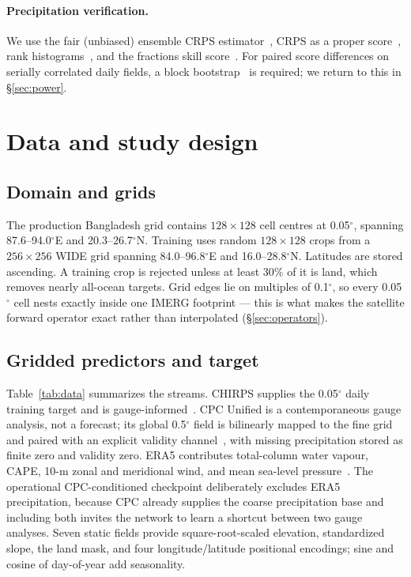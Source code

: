 \documentclass[10pt,twocolumn]{article}
\begin{document}
\paragraph{Precipitation verification.}
We use the fair (unbiased) ensemble CRPS estimator~\cite{ferro2014,zamo2018},
CRPS as a proper score~\cite{gneiting2007,hersbach2000}, rank
histograms~\cite{hamill2001}, and the fractions skill
score~\cite{roberts2008}. For paired score differences on serially correlated
daily fields, a block bootstrap~\cite{politis1994} is required; we return to
this in \S\ref{sec:power}.

\section{Data and study design}

\subsection{Domain and grids}

The production Bangladesh grid contains $128\times128$ cell centres at
0.05$^\circ$, spanning 87.6--94.0$^\circ$E and 20.3--26.7$^\circ$N. Training
uses random $128\times128$ crops from a $256\times256$ WIDE grid spanning
84.0--96.8$^\circ$E and 16.0--28.8$^\circ$N. Latitudes are stored ascending.
A training crop is rejected unless at least 30\% of it is land, which removes
nearly all-ocean targets. Grid edges lie on multiples of 0.1$^\circ$, so every
0.05$^\circ$ cell nests exactly inside one IMERG footprint --- this is what
makes the satellite forward operator exact rather than interpolated
(\S\ref{sec:operators}).

\subsection{Gridded predictors and target}

Table~\ref{tab:data} summarizes the streams. CHIRPS supplies the 0.05$^\circ$
daily training target and is gauge-informed~\cite{funk2015}. CPC Unified is a
contemporaneous gauge analysis, not a forecast; its global 0.5$^\circ$ field is
bilinearly mapped to the fine grid and paired with an explicit validity
channel~\cite{chen2008}, with missing precipitation stored as finite zero and
validity zero. ERA5 contributes total-column water vapour, CAPE, 10-m zonal
and meridional wind, and mean sea-level pressure~\cite{hersbach2020}. The
operational CPC-conditioned checkpoint deliberately excludes ERA5
precipitation, because CPC already supplies the coarse precipitation base and
including both invites the network to learn a shortcut between two gauge
analyses. Seven static fields provide square-root-scaled elevation,
standardized slope, the land mask, and four longitude/latitude positional
encodings; sine and cosine of day-of-year add seasonality.
\end{document}
